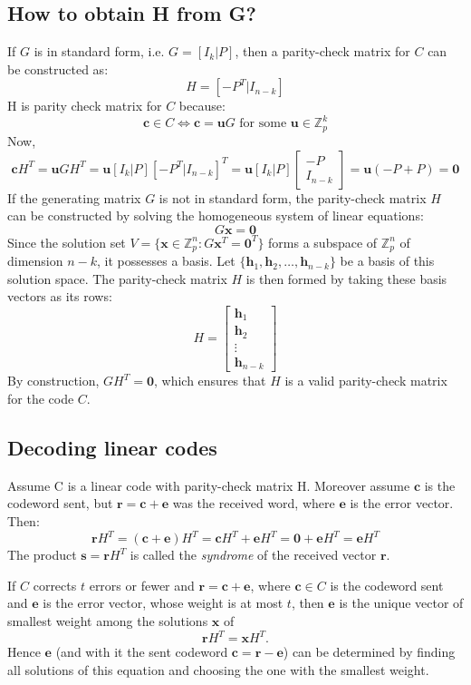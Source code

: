 \documentclass[docmute]{article}
\begin{document}
\subsection*{How to obtain H from G?}
If $G$ is in standard form, i.e. $G = [I_k | P]$, then a parity-check matrix for $C$ can be constructed as:
$$H = [-P^T | I_{n-k}]$$
H is parity check matrix for $C$ because:
$$\mathbf{c} \in C \iff \mathbf{c} = \mathbf{u}G \text{ for some } \mathbf{u} \in \mathbb{Z}_p^k$$
Now,
$$\mathbf{c}H^T = \mathbf{u}GH^T = \mathbf{u}[I_k | P][-P^T | I_{n-k}]^T = \mathbf{u}[I_k | P]\begin{bmatrix} -P \\ I_{n-k} \end{bmatrix} = \mathbf{u}(-P + P) = \mathbf{0}$$
If the generating matrix $G$ is not in standard form, the parity-check matrix $H$ can be constructed by solving the homogeneous system of linear equations:
$$G\mathbf{x} = \mathbf{0}$$
Since the solution set $V = \{\mathbf{x} \in \mathbb{Z}_p^n : G\mathbf{x}^T = \mathbf{0}^T\}$ forms a subspace of $\mathbb{Z}_p^n$ of dimension $n-k$, it possesses a basis. 
Let $\{\mathbf{h}_1, \mathbf{h}_2, \dots, \mathbf{h}_{n-k}\}$ be a basis of this solution space.
The parity-check matrix $H$ is then formed by taking these basis vectors as its rows:
$$H = \begin{bmatrix} \mathbf{h}_1 \\ \mathbf{h}_2 \\ \vdots \\ \mathbf{h}_{n-k} \end{bmatrix}$$
By construction, $G H^T = \mathbf{0}$, which ensures that $H$ is a valid parity-check matrix for the code $C$.
\subsection*{Decoding linear codes}
Assume C is a linear code with parity-check matrix H. Moreover assume $\mathbf{c}$ is the codeword sent, but $\mathbf{r} = \mathbf{c} + \mathbf{e}$ was the received word, where $\mathbf{e}$ is the error vector. 
Then:
$$\mathbf{r}H^T = (\mathbf{c} + \mathbf{e})H^T = \mathbf{c}H^T + \mathbf{e}H^T = \mathbf{0} + \mathbf{e}H^T = \mathbf{e}H^T$$
The product $\mathbf{s} = \mathbf{r}H^T$ is called the \emph{syndrome} of the received vector $\mathbf{r}$.

\begin{theorem}
If $C$ corrects $t$ errors or fewer and $\mathbf{r} = \mathbf{c} + \mathbf{e}$, where $\mathbf{c} \in C$ is the codeword sent and $\mathbf{e}$ is the error vector, whose weight is at most $t$, then $\mathbf{e}$ is the unique vector of smallest weight among the solutions $\mathbf{x}$ of
$$\mathbf{r}H^T = \mathbf{x}H^T.$$
Hence $\mathbf{e}$ (and with it the sent codeword $\mathbf{c} = \mathbf{r} - \mathbf{e}$) can be determined by finding all solutions of this equation and choosing the one with the smallest weight.
\end{theorem}
\end{document}
